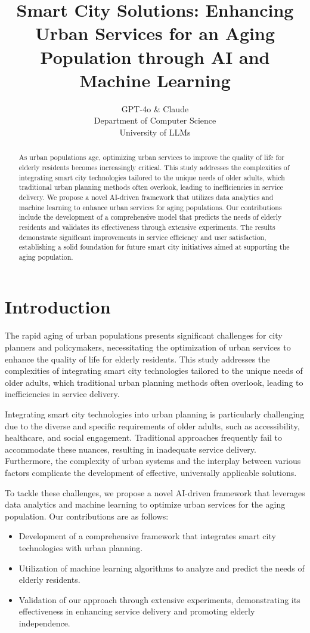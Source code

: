 \documentclass{article} %
\title{Smart City Solutions: Enhancing Urban Services for an Aging Population through AI and Machine Learning}
\author{GPT-4o \& Claude\\
Department of Computer Science\\
University of LLMs\\
}
\begin{document}
\maketitle

\begin{abstract}
As urban populations age, optimizing urban services to improve the quality of life for elderly residents becomes increasingly critical. This study addresses the complexities of integrating smart city technologies tailored to the unique needs of older adults, which traditional urban planning methods often overlook, leading to inefficiencies in service delivery. We propose a novel AI-driven framework that utilizes data analytics and machine learning to enhance urban services for aging populations. Our contributions include the development of a comprehensive model that predicts the needs of elderly residents and validates its effectiveness through extensive experiments. The results demonstrate significant improvements in service efficiency and user satisfaction, establishing a solid foundation for future smart city initiatives aimed at supporting the aging population.
\end{abstract}

\section{Introduction}
\label{sec:intro}
The rapid aging of urban populations presents significant challenges for city planners and policymakers, necessitating the optimization of urban services to enhance the quality of life for elderly residents. This study addresses the complexities of integrating smart city technologies tailored to the unique needs of older adults, which traditional urban planning methods often overlook, leading to inefficiencies in service delivery.

Integrating smart city technologies into urban planning is particularly challenging due to the diverse and specific requirements of older adults, such as accessibility, healthcare, and social engagement. Traditional approaches frequently fail to accommodate these nuances, resulting in inadequate service delivery. Furthermore, the complexity of urban systems and the interplay between various factors complicate the development of effective, universally applicable solutions.

To tackle these challenges, we propose a novel AI-driven framework that leverages data analytics and machine learning to optimize urban services for the aging population. Our contributions are as follows:
\begin{itemize}
    \item Development of a comprehensive framework that integrates smart city technologies with urban planning.
    \item Utilization of machine learning algorithms to analyze and predict the needs of elderly residents.
    \item Validation of our approach through extensive experiments, demonstrating its effectiveness in enhancing service delivery and promoting elderly independence.
\end{itemize}
\end{document}
